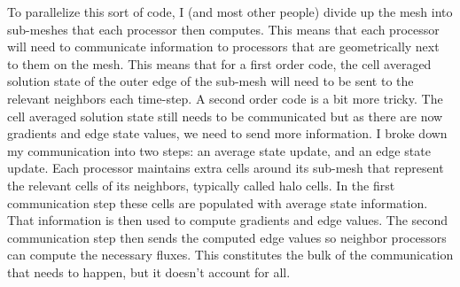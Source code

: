 \documentclass[12pt,parskip=full]{article}
\numberwithin{subsection}{section}
\begin{document}
		To parallelize this sort of code, I (and most other people) divide up the mesh into sub-meshes that each processor then computes.
		This means that each processor will need to communicate information to processors that are geometrically next to them on the 
		mesh. This means that for a first order code, the cell averaged solution state of the outer edge of the sub-mesh will need to be
		sent to the relevant neighbors each time-step. A second order code is a bit more tricky. The cell averaged solution state still
		needs to be communicated but as there are now gradients and edge state values, we need to send more information. I broke down my
		communication into two steps: an average state update, and an edge state update. Each processor maintains extra cells around its
		sub-mesh that represent the relevant cells of its neighbors, typically called halo cells. In the first communication step these
		cells are populated with average state information. That information is then used to compute gradients and edge values. The
		second communication step then sends the computed edge values so neighbor processors can compute the necessary fluxes.
		This constitutes the bulk of the communication that needs to happen, but it doesn't account for all.
\end{document}
